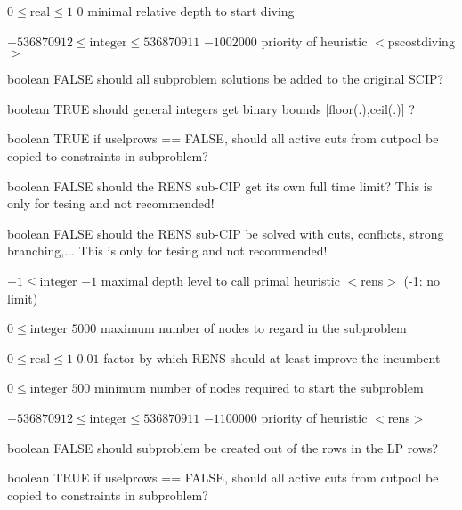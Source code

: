 %
{$0\leq\textrm{real}\leq1$}%
{$0$}%
{minimal relative depth to start diving}%
{}

%
{$-536870912\leq\textrm{integer}\leq536870911$}%
{$-1002000$}%
{priority of heuristic $<$pscostdiving$>$}%
{}

%
{boolean}%
{FALSE}%
{should all subproblem solutions be added to the original SCIP?}%
{}

%
{boolean}%
{TRUE}%
{should general integers get binary bounds [floor(.),ceil(.)] ?}%
{}

%
{boolean}%
{TRUE}%
{if uselprows == FALSE, should all active cuts from cutpool be copied to constraints in subproblem?}%
{}

%
{boolean}%
{FALSE}%
{should the RENS sub-CIP get its own full time limit? This is only for tesing and not recommended!}%
{}

%
{boolean}%
{FALSE}%
{should the RENS sub-CIP be solved with cuts, conflicts, strong branching,... This is only for tesing and not recommended!}%
{}

%
{$-1\leq\textrm{integer}$}%
{$-1$}%
{maximal depth level to call primal heuristic $<$rens$>$ (-1: no limit)}%
{}

%
{$0\leq\textrm{integer}$}%
{$5000$}%
{maximum number of nodes to regard in the subproblem}%
{}

%
{$0\leq\textrm{real}\leq1$}%
{$0.01$}%
{factor by which RENS should at least improve the incumbent}%
{}

%
{$0\leq\textrm{integer}$}%
{$500$}%
{minimum number of nodes required to start the subproblem}%
{}

%
{$-536870912\leq\textrm{integer}\leq536870911$}%
{$-1100000$}%
{priority of heuristic $<$rens$>$}%
{}

%
{boolean}%
{FALSE}%
{should subproblem be created out of the rows in the LP rows?}%
{}

%
{boolean}%
{TRUE}%
{if uselprows == FALSE, should all active cuts from cutpool be copied to constraints in subproblem?}%
{}

